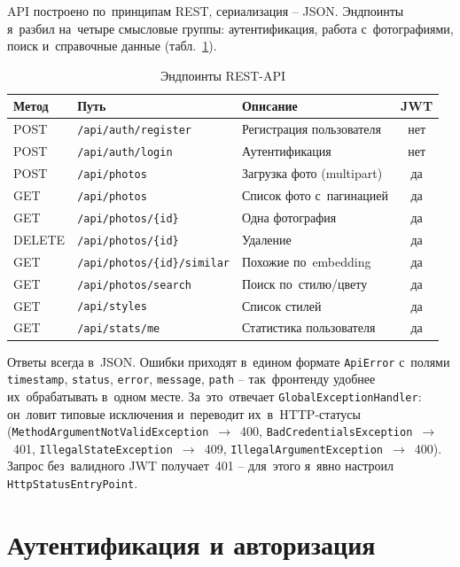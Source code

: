\documentclass[a4paper,12pt]{diplom}
\begin{document}
API построено по~принципам REST, сериализация -- JSON. Эндпоинты я~разбил на~четыре смысловые группы: аутентификация, работа с~фотографиями, поиск и~справочные данные (табл.~\ref{tab:endpoints}).

\begin{table}[!ht]
\caption{Эндпоинты REST-API}
\label{tab:endpoints}
\centering
\begin{tabular}{lp{5cm}p{4cm}c}
\toprule
\textbf{Метод} & \textbf{Путь} & \textbf{Описание} & \textbf{JWT} \\
\midrule
POST   & \texttt{/api/auth/register}     & Регистрация пользователя   & нет \\
POST   & \texttt{/api/auth/login}        & Аутентификация             & нет \\
POST   & \texttt{/api/photos}            & Загрузка фото (multipart)  & да  \\
GET    & \texttt{/api/photos}            & Список фото с~пагинацией   & да  \\
GET    & \texttt{/api/photos/\{id\}}     & Одна фотография            & да  \\
DELETE & \texttt{/api/photos/\{id\}}     & Удаление                   & да  \\
GET    & \texttt{/api/photos/\{id\}/similar} & Похожие по~embedding   & да  \\
GET    & \texttt{/api/photos/search}     & Поиск по~стилю/цвету       & да  \\
GET    & \texttt{/api/styles}            & Список стилей              & да  \\
GET    & \texttt{/api/stats/me}          & Статистика пользователя    & да  \\
\bottomrule
\end{tabular}
\end{table}

Ответы всегда в~JSON. Ошибки приходят в~едином формате \texttt{ApiError} с~полями \verb|timestamp|, \verb|status|, \verb|error|, \verb|message|, \verb|path| -- так~фронтенду удобнее их~обрабатывать в~одном месте. За~это~отвечает \texttt{GlobalExceptionHandler}: он~ловит типовые исключения и~переводит их~в~HTTP-статусы (\texttt{MethodArgumentNotValidException}~$\to$~400, \texttt{BadCredentialsException}~$\to$~401, \texttt{IllegalStateException}~$\to$~409, \texttt{IllegalArgumentException}~$\to$~400). Запрос без~валидного JWT получает~401 -- для~этого я~явно настроил \texttt{HttpStatusEntryPoint}.

\section{Аутентификация и авторизация}
\label{sec:auth}
\end{document}
